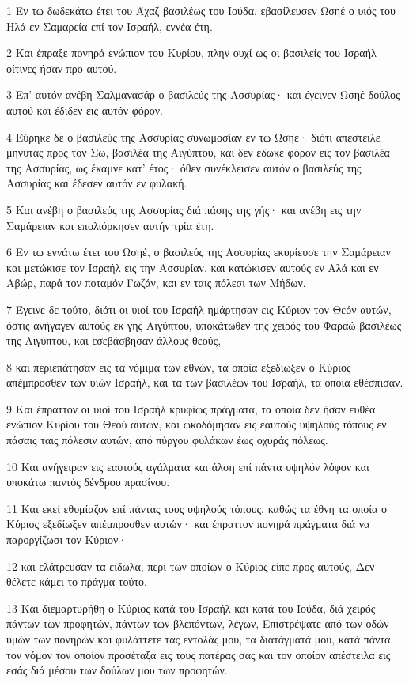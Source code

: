 \par 1 Εν τω δωδεκάτω έτει του Άχαζ βασιλέως του Ιούδα, εβασίλευσεν Ωσηέ ο υιός του Ηλά εν Σαμαρεία επί τον Ισραήλ, εννέα έτη.
\par 2 Και έπραξε πονηρά ενώπιον του Κυρίου, πλην ουχί ως οι βασιλείς του Ισραήλ οίτινες ήσαν προ αυτού.
\par 3 Επ' αυτόν ανέβη Σαλμανασάρ ο βασιλεύς της Ασσυρίας· και έγεινεν Ωσηέ δούλος αυτού και έδιδεν εις αυτόν φόρον.
\par 4 Εύρηκε δε ο βασιλεύς της Ασσυρίας συνωμοσίαν εν τω Ωσηέ· διότι απέστειλε μηνυτάς προς τον Σω, βασιλέα της Αιγύπτου, και δεν έδωκε φόρον εις τον βασιλέα της Ασσυρίας, ως έκαμνε κατ' έτος· όθεν συνέκλεισεν αυτόν ο βασιλεύς της Ασσυρίας και έδεσεν αυτόν εν φυλακή.
\par 5 Και ανέβη ο βασιλεύς της Ασσυρίας διά πάσης της γής· και ανέβη εις την Σαμάρειαν και επολιόρκησεν αυτήν τρία έτη.
\par 6 Εν τω εννάτω έτει του Ωσηέ, ο βασιλεύς της Ασσυρίας εκυρίευσε την Σαμάρειαν και μετώκισε τον Ισραήλ εις την Ασσυρίαν, και κατώκισεν αυτούς εν Αλά και εν Αβώρ, παρά τον ποταμόν Γωζάν, και εν ταις πόλεσι των Μήδων.
\par 7 Έγεινε δε τούτο, διότι οι υιοί του Ισραήλ ημάρτησαν εις Κύριον τον Θεόν αυτών, όστις ανήγαγεν αυτούς εκ γης Αιγύπτου, υποκάτωθεν της χειρός του Φαραώ βασιλέως της Αιγύπτου, και εσεβάσβησαν άλλους θεούς,
\par 8 και περιεπάτησαν εις τα νόμιμα των εθνών, τα οποία εξεδίωξεν ο Κύριος απέμπροσθεν των υιών Ισραήλ, και τα των βασιλέων του Ισραήλ, τα οποία εθέσπισαν.
\par 9 Και έπραττον οι υιοί του Ισραήλ κρυφίως πράγματα, τα οποία δεν ήσαν ευθέα ενώπιον Κυρίου του Θεού αυτών, και ωκοδόμησαν εις εαυτούς υψηλούς τόπους εν πάσαις ταις πόλεσιν αυτών, από πύργου φυλάκων έως οχυράς πόλεως.
\par 10 Και ανήγειραν εις εαυτούς αγάλματα και άλση επί πάντα υψηλόν λόφον και υποκάτω παντός δένδρου πρασίνου.
\par 11 Και εκεί εθυμίαζον επί πάντας τους υψηλούς τόπους, καθώς τα έθνη τα οποία ο Κύριος εξεδίωξεν απέμπροσθεν αυτών· και έπραττον πονηρά πράγματα διά να παροργίζωσι τον Κύριον·
\par 12 και ελάτρευσαν τα είδωλα, περί των οποίων ο Κύριος είπε προς αυτούς, Δεν θέλετε κάμει το πράγμα τούτο.
\par 13 Και διεμαρτυρήθη ο Κύριος κατά του Ισραήλ και κατά του Ιούδα, διά χειρός πάντων των προφητών, πάντων των βλεπόντων, λέγων, Επιστρέψατε από των οδών υμών των πονηρών και φυλάττετε τας εντολάς μου, τα διατάγματά μου, κατά πάντα τον νόμον τον οποίον προσέταξα εις τους πατέρας σας και τον οποίον απέστειλα εις εσάς διά μέσου των δούλων μου των προφητών.

